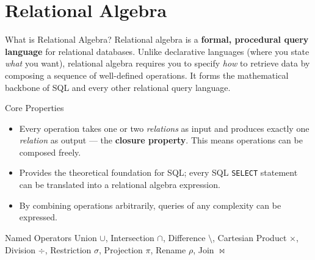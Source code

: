 \section{Relational Algebra}

\begin{frame}{What is Relational Algebra?}
  Relational algebra is a \textbf{formal, procedural query language} for
  relational databases.  Unlike declarative languages (where you state
  \emph{what} you want), relational algebra requires you to specify
  \emph{how} to retrieve data by composing a sequence of well-defined
  operations.  It forms the mathematical backbone of SQL and every other
  relational query language.

  \begin{block}{Core Properties}
    \begin{itemize}
      \item Every operation takes one or two \emph{relations} as input and
            produces exactly one \emph{relation} as output — the
            \textbf{closure property}.  This means operations can be
            composed freely.
      \item Provides the theoretical foundation for SQL; every SQL
            \texttt{SELECT} statement can be translated into a relational
            algebra expression.
      \item By combining operations arbitrarily, queries of any complexity
            can be expressed.
    \end{itemize}
  \end{block}

  \begin{block}{Named Operators}
    Union $\cup$, Intersection $\cap$, Difference $\setminus$, Cartesian
    Product $\times$, Division $\div$, Restriction $\sigma$, Projection
    $\pi$, Rename $\rho$, Join $\bowtie$
  \end{block}
\end{frame}

